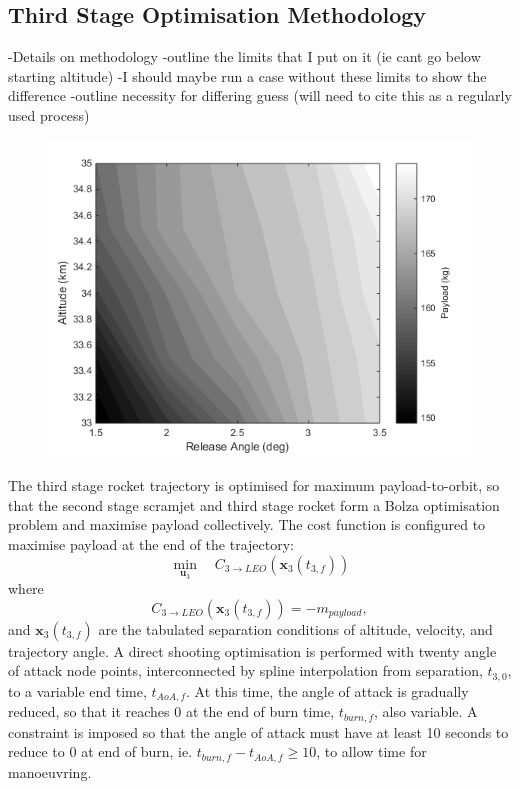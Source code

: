 \subsection{Third Stage Optimisation Methodology}
-Details on methodology
-outline the limits that I put on it (ie cant go below starting altitude)
-I should maybe run a case without these limits to show the difference
-outline necessity for differing guess (will need to cite this as a regularly used process)

\begin{figure}[h]
\centering
\includegraphics[width=0.7\linewidth]{figures/5_Ascent/contours}
\caption{}
\label{fig:contours}
\end{figure}


The third stage rocket trajectory is optimised for maximum payload-to-orbit, so that the second stage scramjet and third stage rocket form a Bolza optimisation problem and maximise payload collectively. The cost function is configured to maximise payload at the end of the trajectory:
\begin{equation} 
\min\limits_{\textbf{u}_3} \quad C_{3\rightarrow LEO}(\textbf{x}_{3}(t_{3,f})) 
\end{equation}
where
\begin{equation}
C_{3\rightarrow LEO}(\textbf{x}_{3}(t_{3,f})) = -m_{payload},
\end{equation}
and $\textbf{x}_{3}(t_{3,f})$ are the tabulated separation conditions of altitude, velocity, and trajectory angle. A direct shooting optimisation is performed with twenty angle of attack node points, interconnected by spline interpolation from separation, $t_{3,0}$, to a variable end time, $t_{AoA,f}$. At this time, the angle of attack is gradually reduced, so that it reaches 0 at the end of burn time, $t_{burn,f}$, also variable.  A constraint is imposed so that the angle of attack must have at least 10 seconds to reduce to 0 at end of burn, ie. $t_{burn,f} - t_{AoA,f} \ge 10$, to allow time for manoeuvring.



